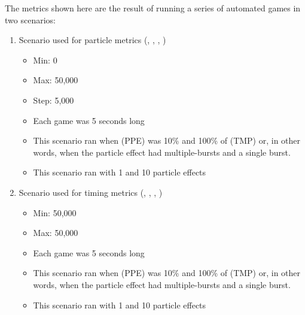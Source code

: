 The metrics shown here are the result of running a series of automated games in two scenarios:

\begin{enumerate}[nolistsep,topsep=2pt]

	\item Scenario used for particle metrics (, , , )
	\begin{itemize}[nolistsep,topsep=0pt]
		\item Min: 0
		\item Max: 50,000
		\item Step: 5,000
		\item Each game was 5 seconds long
		\item This scenario ran when  (PPE) was 10\% and 100\% of  (TMP) or, in other words, when the particle effect had multiple-bursts and a single burst.
		\item This scenario ran with 1 and 10 particle effects
	\end{itemize}

	\item Scenario used for timing metrics (, , , )
	\begin{itemize}[nolistsep,topsep=0pt]
		\item Min: 50,000
		\item Max: 50,000
		\item Each game was 5 seconds long
		\item This scenario ran when  (PPE) was 10\% and 100\% of  (TMP) or, in other words, when the particle effect had multiple-bursts and a single burst.
		\item This scenario ran with 1 and 10 particle effects
	\end{itemize}

\end{enumerate}

